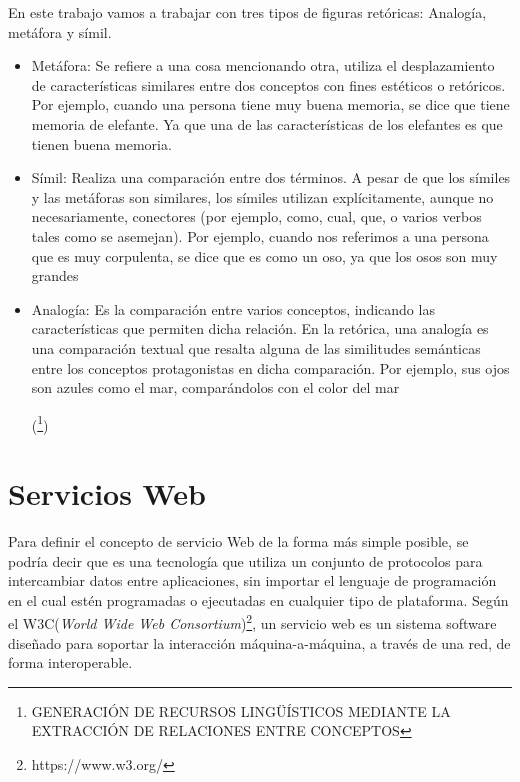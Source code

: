 En este trabajo vamos a trabajar con tres tipos de figuras retóricas: Analogía, metáfora y símil.
\begin{itemize}
	\item Metáfora: Se refiere a una cosa mencionando otra, utiliza el desplazamiento de características similares entre dos conceptos con fines estéticos o retóricos. Por ejemplo, cuando una persona tiene muy buena memoria, se dice que tiene memoria de elefante. Ya que una de las características de los elefantes es que tienen buena memoria.
	
	\item Símil: Realiza una comparación entre dos términos. A pesar de que los símiles y las metáforas son similares, los símiles utilizan explícitamente, aunque no necesariamente, conectores (por ejemplo, como, cual, que, o varios verbos tales como se asemejan).
	Por ejemplo, cuando nos referimos a una persona que es muy corpulenta, se dice que es como un oso, ya que los osos son muy grandes
	
	\item Analogía: Es la comparación entre varios conceptos, indicando las características que permiten dicha relación. En la retórica, una analogía es una comparación textual que resalta alguna de las similitudes semánticas entre los conceptos protagonistas en dicha comparación. Por ejemplo, sus ojos son azules como el mar, comparándolos con el color del mar
	
	(\footnote {GENERACIÓN DE RECURSOS LINGÜÍSTICOS MEDIANTE LA EXTRACCIÓN DE RELACIONES ENTRE CONCEPTOS})	
	
\end{itemize}

\section{Servicios Web}
\label{cap:sec:servicios_web}

Para definir el concepto de servicio Web de la forma más simple posible, se podría decir que es una tecnología que utiliza un conjunto de protocolos para intercambiar datos entre aplicaciones, sin importar el lenguaje de programación en el cual estén programadas o ejecutadas en cualquier tipo de plataforma.\citep{wiki:w3c2004} Según el W3C(\textit{World Wide Web Consortium})\footnote{https://www.w3.org/}, un servicio web es un sistema software diseñado para soportar la interacción máquina-a-máquina, a través de una red, de forma interoperable. 
\newline



